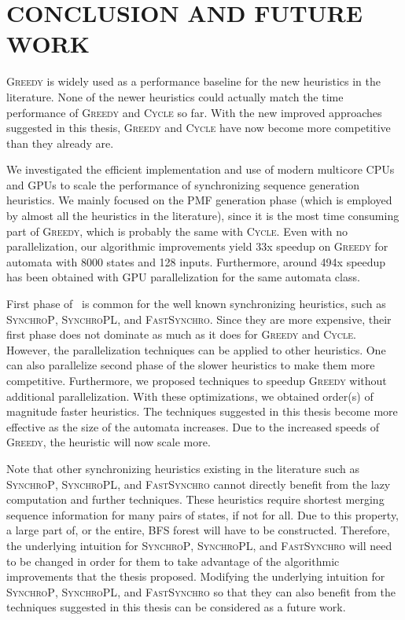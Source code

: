 \chapter{CONCLUSION AND FUTURE WORK}
\label{sec:conclusion}

\textsc{Greedy} is widely used as a performance baseline for the new heuristics in the literature. None of the newer heuristics could actually match the time performance of \textsc{Greedy} and \textsc{Cycle} so far. With the new improved approaches suggested in this thesis, \textsc{Greedy} and \textsc{Cycle} have now become more competitive than they already are.

We investigated the efficient implementation and use of modern multicore CPUs and GPUs to scale the performance of synchronizing sequence generation heuristics. We mainly focused on the PMF generation phase (which is employed by almost all the heuristics in the literature), since it is the most time consuming part of \textsc{Greedy}, which is probably the same with \textsc{Cycle}. Even with no parallelization, our algorithmic improvements yield 33x speedup on \textsc{Greedy} for automata with 8000 states and 128 inputs. Furthermore, around 494x speedup has been obtained with GPU parallelization for the same automata class.

First phase of \greedyAlgo\ is common for the well known synchronizing heuristics, such as \textsc{SynchroP}, \textsc{SynchroPL}, and \textsc{FastSynchro}. Since they are more expensive, their first phase does not dominate as much as it does for \textsc{Greedy} and \textsc{Cycle}. However, the parallelization techniques can be applied to other heuristics. One can also parallelize second phase of the slower heuristics to make them more competitive. Furthermore, we proposed techniques to speedup \textsc{Greedy} without additional parallelization. With these optimizations, we obtained order(s) of magnitude faster heuristics. The techniques suggested in this thesis become more effective as the size of the automata increases. Due to the increased speeds of \textsc{Greedy}, the heuristic will now scale more.

\pagebreak

Note that other synchronizing heuristics existing in the literature such as \textsc{SynchroP}, \textsc{SynchroPL}, and \textsc{FastSynchro} cannot directly benefit from the lazy computation and further techniques. These heuristics require shortest merging sequence information for many pairs of states, if not for all. Due to this property, a large part of, or the entire, BFS forest will have to be constructed. Therefore, the underlying intuition for  \textsc{SynchroP}, \textsc{SynchroPL}, and \textsc{FastSynchro} will need to be changed in order for them to take advantage of the algorithmic improvements that the thesis proposed. Modifying the underlying intuition for \textsc{SynchroP}, \textsc{SynchroPL}, and \textsc{FastSynchro} so that they can also benefit from the techniques suggested in this thesis can be considered as a future work.
